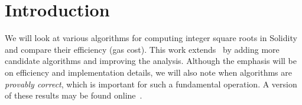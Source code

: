 \section{Introduction}

We will look at various algorithms for computing integer square roots
in Solidity and compare their efficiency (gas cost).
This work extends~\cite{EfficientIsqrt}
by adding more candidate algorithms and improving the analysis.
Although the emphasis will be on efficiency and implementation details,
we will also note when algorithms are \emph{provably correct},
which is important for such a fundamental operation.
A version of these results may be found online~\cite{IsqrtRepo}.
